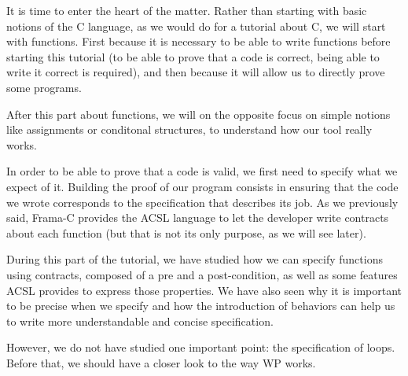 It is time to enter the heart of the matter. Rather than starting with
basic notions of the C language, as we would do for a tutorial about C,
we will start with functions. First because it is necessary to be able
to write functions before starting this tutorial (to be able to prove
that a code is correct, being able to write it correct is required), and
then because it will allow us to directly prove some programs.



After this part about functions, we will on the opposite focus on simple
notions like assignments or conditonal structures, to understand how our
tool really works.



In order to be able to prove that a code is valid, we first need to
specify what we expect of it. Building the proof of our program consists
in ensuring that the code we wrote corresponds to the specification that
describes its job. As we previously said, Frama-C provides the ACSL
language to let the developer write contracts about each function (but
that is not its only purpose, as we will see later).




















\horizontalLine



During this part of the tutorial, we have studied how we can specify
functions using contracts, composed of a pre and a post-condition, as
well as some features ACSL provides to express those properties. We have
also seen why it is important to be precise when we specify and how the
introduction of behaviors can help us to write more understandable and
concise specification.

However, we do not have studied one important point: the specification
of loops. Before that, we should have a closer look to the way WP works.
